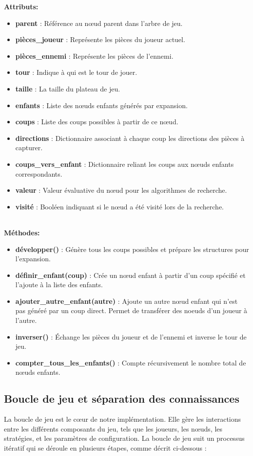 \noindent\textbf{Attributs:}
\begin{itemize}
    \item \textbf{parent} : Référence au nœud parent dans l'arbre de jeu.
    \item \textbf{pièces\_joueur} : Représente les pièces du joueur actuel.
    \item \textbf{pièces\_ennemi} : Représente les pièces de l'ennemi.
    \item \textbf{tour} : Indique à qui est le tour de jouer.
    \item \textbf{taille} : La taille du plateau de jeu.
    \item \textbf{enfants} : Liste des nœuds enfants générés par expansion.
    \item \textbf{coups} : Liste des coups possibles à partir de ce nœud.
    \item \textbf{directions} : Dictionnaire associant à chaque coup les directions des pièces à capturer.
    \item \textbf{coups\_vers\_enfant} : Dictionnaire reliant les coups aux nœuds enfants correspondants.
    \item \textbf{valeur} : Valeur évaluative du nœud pour les algorithmes de recherche.
    \item \textbf{visité} : Booléen indiquant si le nœud a été visité lors de la recherche.
\end{itemize}
\leavevmode\\
\textbf{Méthodes:}
\begin{itemize}
    \item \textbf{développer()} : Génère tous les coups possibles et prépare les structures pour l'expansion.
    \item \textbf{définir\_enfant(coup)} : Crée un nœud enfant à partir d'un coup spécifié et l'ajoute à la liste des enfants.
    \item \textbf{ajouter\_autre\_enfant(autre)} : Ajoute un autre nœud enfant qui n'est pas généré par un coup direct. Permet de transférer des noeuds d'un joueur à l'autre.
    \item \textbf{inverser()} : Échange les pièces du joueur et de l'ennemi et inverse le tour de jeu.
    \item \textbf{compter\_tous\_les\_enfants()} : Compte récursivement le nombre total de nœuds enfants.
\end{itemize}


\subsection{Boucle de jeu et séparation des connaissances}
\label{subsec:game_loop}
La boucle de jeu est le cœur de notre implémentation. Elle gère les interactions entre les différents composants du jeu, tels que les joueurs, les nœuds, les stratégies, et les paramètres de configuration. La boucle de jeu suit un processus itératif qui se déroule en plusieurs étapes, comme décrit ci-dessous :

